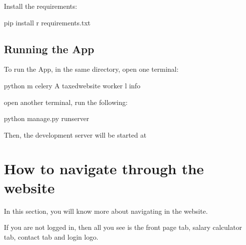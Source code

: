 \documentclass[letterpaper,10pt,english]{sphinxmanual}
\begin{document}
\sphinxAtStartPar
Install the requirements:

\begin{sphinxVerbatim}[commandchars=\\\{\}]
\PYGZdl{} pip install \PYGZhy{}r requirements.txt
\end{sphinxVerbatim}


\section{Running the App}
\label{\detokenize{pages/installation-testing:running-the-app}}
\sphinxAtStartPar
To run the App, in the same directory, open one terminal:

\begin{sphinxVerbatim}[commandchars=\\\{\}]
\PYGZdl{} python \PYGZhy{}m celery \PYGZhy{}A taxedwebsite worker \PYGZhy{}l info
\end{sphinxVerbatim}

\sphinxAtStartPar
open another terminal, run the following:

\begin{sphinxVerbatim}[commandchars=\\\{\}]
\PYGZdl{} python manage.py runserver
\end{sphinxVerbatim}

\sphinxAtStartPar
Then, the development server will be started at 

\sphinxstepscope


\chapter{How to navigate through the website}
\label{\detokenize{pages/navigation-bar:how-to-navigate-through-the-website}}\label{\detokenize{pages/navigation-bar::doc}}
\sphinxAtStartPar
In this section, you will know more about navigating in the website.

\sphinxAtStartPar
If you are not logged in, then all you see is the front page tab, salary calculator tab, contact tab and login logo.
\end{document}
